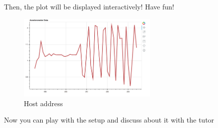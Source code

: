 \documentclass{article}
\begin{document}
Then, the plot will be displayed interactively! Have fun!

\begin{figure}[h!]
    \centering
    \includegraphics[width=0.6\textwidth]{img/acc.png}
    \caption{Host address}
    \label{fig:bokeh}
\end{figure}


Now you can play with the setup and discuss about it with the tutor












\end{document}
